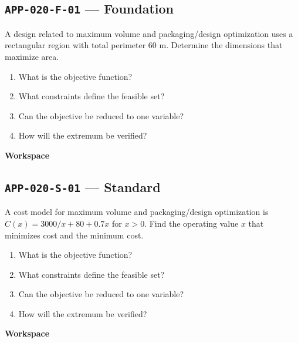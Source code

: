 \documentclass[11pt]{book}
\newcommand{\pid}[1]{\texttt{#1}}
\newcommand{\workspace}{\par\vspace{0.7in}\hrulefill\par\vspace{0.55in}\hrulefill\par}
\begin{document}
\subsection*{\pid{APP-020-F-01} — Foundation}
\begin{problembox}
A design related to maximum volume and packaging/design optimization uses a rectangular region with total perimeter 60 m. Determine the dimensions that maximize area.
\end{problembox}
\begin{promptbox}\begin{enumerate}
\item What is the objective function?
\item What constraints define the feasible set?
\item Can the objective be reduced to one variable?
\item How will the extremum be verified?
\end{enumerate}\end{promptbox}
\textbf{Workspace}\workspace
{}
\subsection*{\pid{APP-020-S-01} — Standard}
\begin{problembox}
A cost model for maximum volume and packaging/design optimization is $C(x)=3000/x+80+0.7x$ for $x>0$. Find the operating value $x$ that minimizes cost and the minimum cost.
\end{problembox}
\begin{promptbox}\begin{enumerate}
\item What is the objective function?
\item What constraints define the feasible set?
\item Can the objective be reduced to one variable?
\item How will the extremum be verified?
\end{enumerate}\end{promptbox}
\textbf{Workspace}\workspace
{}
\end{document}
